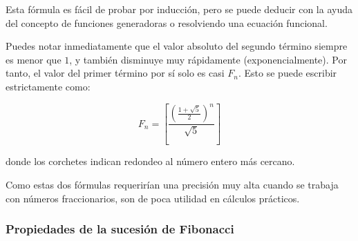 Esta fórmula es fácil de probar por inducción, pero se puede deducir con la ayuda del concepto de funciones generadoras o resolviendo una ecuación funcional.

Puedes notar inmediatamente que el valor absoluto del segundo término siempre es menor que $1$, y también disminuye muy rápidamente (exponencialmente). Por tanto, el valor del primer término por sí solo es casi $F_n$. Esto se puede escribir estrictamente como:

$$F_n = \left[\frac{\left(\frac{1 + \sqrt{5}}{2}\right)^n}{\sqrt{5}}\right]$$

donde los corchetes indican redondeo al número entero más cercano.

Como estas dos fórmulas requerirían una precisión muy alta cuando se trabaja con números fraccionarios, son de poca utilidad en cálculos prácticos.

\subsubsection*{Propiedades de la sucesión de Fibonacci}


